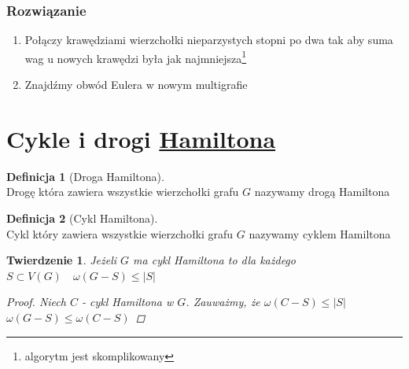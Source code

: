 \documentclass[12pt,a4paper]{article}
\newtheorem{tw}{Twierdzenie}
\theoremstyle{definition}
\newtheorem{df}{Definicja}
\begin{document}
\subsubsection{Rozwiązanie}
\begin{enumerate}
	\item Połączy krawędziami wierzchołki nieparzystych stopni po dwa tak aby suma wag u nowych krawędzi była jak najmniejsza\footnote{algorytm jest skomplikowany}
	\item Znajdźmy obwód Eulera w nowym multigrafie
\end{enumerate}

\section{Cykle i drogi \href{http://pl.wikipedia.org/wiki/William_Rowan_Hamilton}{Hamiltona}}

\begin{df}[Droga Hamiltona]~\\
Drogę która zawiera wszystkie wierzchołki grafu $G$ nazywamy drogą Hamiltona
\end{df}

\begin{df}[Cykl Hamiltona]~\\
Cykl który zawiera wszystkie wierzchołki grafu $G$ nazywamy cyklem Hamiltona
\end{df}



\begin{tw}
Jeżeli $G$ ma cykl Hamiltona to dla każdego $S\subset V(G) \quad \omega(G-S) \leqslant |S|$
\begin{proof}
Niech $C$ - cykl Hamiltona w $G$. Zauważmy, że $\omega(C-S) \leqslant |S|$ \\
$\omega(G-S) \leqslant \omega(C-S)$
\end{proof}
\end{tw}
\end{document}

